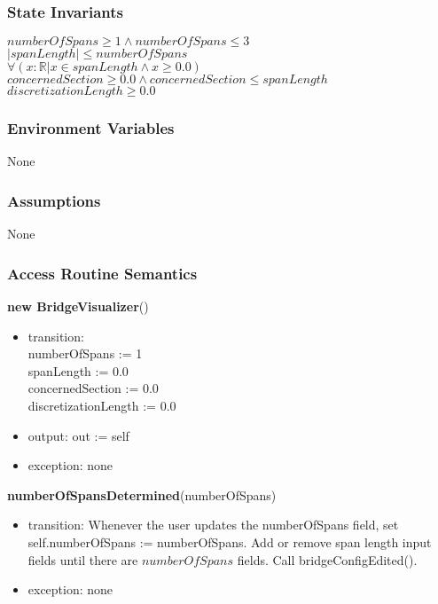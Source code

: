 \documentclass[12pt, titlepage]{article}
\begin{document}
\subsubsection{State Invariants}
$numberOfSpans \geq 1 \land numberOfSpans \leq 3$\\
$|spanLength| \leq numberOfSpans$\\
$\forall(x : \mathbb{R} | x \in spanLength \land x \geq 0.0)$\\
$concernedSection \geq 0.0 \land concernedSection \leq spanLength$\\
$discretizationLength \geq 0.0$
\subsubsection{Environment Variables}
None
\subsubsection{Assumptions}
None
\subsubsection{Access Routine Semantics}

\noindent \textbf{new BridgeVisualizer}()
\begin{itemize}
\item transition: \\
		numberOfSpans := 1\\
		spanLength := 0.0\\
		concernedSection := 0.0\\
		discretizationLength := 0.0
\item output: out := self
\item exception: none
\end{itemize}

\noindent \textbf{numberOfSpansDetermined}(numberOfSpans)
\begin{itemize}
\item transition: Whenever the user updates the numberOfSpans field, set self.numberOfSpans := numberOfSpans. Add or remove span length input fields until there are $numberOfSpans$ fields. Call bridgeConfigEdited().
\item exception: none
\end{itemize}
\end{document}
